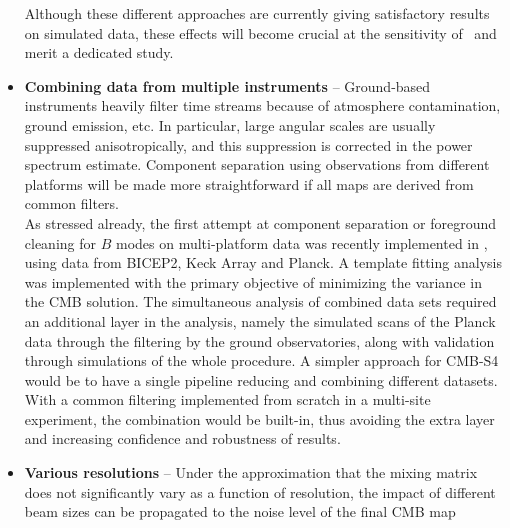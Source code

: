\begin{itemize}
Although these different approaches are currently giving satisfactory results on simulated data, these effects will become crucial at the sensitivity of \cmbexp\ and merit a dedicated study. 
	\item \textbf{Combining data from multiple instruments} -- Ground-based instruments heavily filter time streams because of atmosphere contamination, ground emission, etc. %
	In particular, large angular scales are usually suppressed anisotropically, and this suppression is corrected in the power spectrum estimate. 
Component separation using observations from different platforms will be made more straightforward if all maps are derived from common filters. \\
	As stressed already, the first attempt at component separation or foreground cleaning for  $B$ modes on multi-platform data was recently implemented in \cite{bicepkeckplanck15}, using data from BICEP2, Keck Array and Planck. A template fitting analysis was implemented with the primary objective of minimizing the variance in the CMB solution.%
The simultaneous analysis of combined data sets 
required an additional layer in the analysis, namely the simulated scans of the Planck data through the filtering by the ground observatories, along with validation through simulations of the whole procedure. A simpler approach for CMB-S4 would be to have a single pipeline reducing and combining different datasets. With a common filtering implemented from scratch in a multi-site experiment, the %
combination would be built-in, thus avoiding the extra layer and increasing confidence and robustness of results.
	\item \textbf{Various resolutions} -- Under the approximation that the mixing matrix does not significantly vary as a function of resolution, the impact of different beam sizes can be propagated to the noise level of the final CMB map %

\end{itemize}
